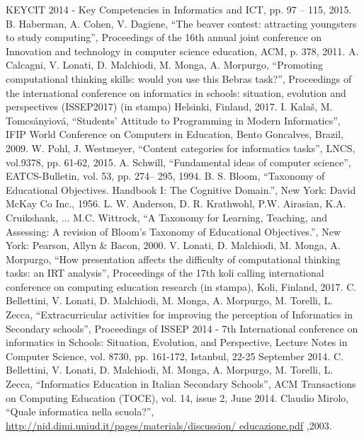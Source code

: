 \documentclass[12pt]{report}
\begin{document}
\begin{thebibliography}{00}
KEYCIT 2014 - Key Competencies in Informatics and ICT, 
pp. 97 – 115, 
2015.
%
B. Haberman, A. Cohen, V. Dagiene, 
``The beaver contest: attracting youngsters to study computing'', 
Proceedings of the 16th annual joint conference on Innovation and technology in computer science education, ACM, 
p. 378, 
2011.
%
A. Calcagni, V. Lonati, D. Malchiodi, M. Monga, A. Morpurgo, 
``Promoting computational thinking skills: would you use this Bebras task?'', 
Proceedings of the international conference on informatics in schools: situation, evolution and perspectives (ISSEP2017) (in stampa) 
Helsinki, Finland, 
2017.
%
I. Kalaš, M. Tomcsányiová, 
``Students’ Attitude to Programming in Modern Informatics'', 
IFIP World Conference on Computers in Education, 
Bento Goncalves, Brazil, 
2009.
%
W. Pohl, J. Westmeyer, 
``Content categories for informatics tasks'', 
LNCS, vol.9378, 
pp. 61-62,
2015. 
%
A. Schwill, 
``Fundamental ideas of computer science'', 
EATCS-Bulletin, vol. 53, 
pp. 274– 295, 
1994.
%
B. S. Bloom,  
``Taxonomy of Educational Objectives. Handbook I: The Cognitive Domain.'', 
New York: David McKay Co Inc.,
1956.
%
L. W. Anderson, D. R. Krathwohl, P.W. Airasian, K.A. Cruikshank, ... M.C. Wittrock,
``A Taxonomy for Learning, Teaching, and Assessing: A revision of Bloom’s Taxonomy of Educational Objectives.'', 
New York: Pearson, Allyn \& Bacon,
2000.
%
V. Lonati, D. Malchiodi, M. Monga, A. Morpurgo, 
``How presentation affects the difficulty of computational thinking tasks: an IRT analysis'', 
Proceedings of the 17th koli calling international conference on computing education research (in stampa),
Koli, Finland, 
2017.
%
C. Bellettini, V. Lonati, D. Malchiodi, M. Monga, A. Morpurgo, M. Torelli, L. Zecca,
``Extracurricular activities for improving the perception of Informatics in Secondary schools'',
Proceedings of ISSEP 2014 - 7th International conference on informatics in Schools: Situation, Evolution, and Perspective, 
Lecture Notes in Computer Science, 
vol. 8730, pp. 161-172,
Istanbul,
22-25 September 
2014.
%
C. Bellettini, V. Lonati, D. Malchiodi, M. Monga, A. Morpurgo, M. Torelli, L. Zecca,
``Informatics Education in Italian Secondary Schools'',
ACM Transactions on Computing Education (TOCE), 
vol. 14, issue 2,
June 
2014.
%
Claudio Mirolo, ``Quale informatica nella scuola?'', \url{http://nid.dimi.uniud.it/pages/materials/discussion/ educazione.pdf} ,2003. 

\end{thebibliography}
\end{document}

